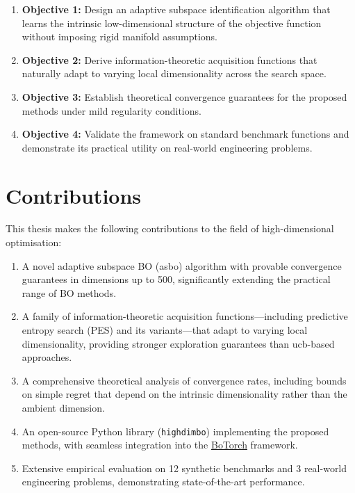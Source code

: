 \begin{enumerate}
    \item \textbf{Objective 1:} Design an adaptive subspace identification
    algorithm that learns the intrinsic low-dimensional structure of the
    objective function without imposing rigid manifold assumptions.

    \item \textbf{Objective 2:} Derive information-theoretic acquisition
    functions that naturally adapt to varying local dimensionality across the
    search space.

    \item \textbf{Objective 3:} Establish theoretical convergence guarantees
    for the proposed methods under mild regularity conditions.

    \item \textbf{Objective 4:} Validate the framework on standard benchmark
    functions and demonstrate its practical utility on real-world engineering
    problems.
\end{enumerate}

\section{Contributions}
\label{sec:contributions}

This thesis makes the following contributions to the field of high-dimensional
optimisation:

\begin{enumerate}
    \item A novel adaptive subspace BO (\gls{asbo}) algorithm with provable
    convergence guarantees in dimensions up to 500, significantly extending the
    practical range of BO methods.

    \item A family of information-theoretic acquisition functions---including
    predictive entropy search (PES) and its variants---that adapt to varying
    local dimensionality, providing stronger exploration guarantees than
    \gls{ucb}-based approaches.

    \item A comprehensive theoretical analysis of convergence rates, including
    bounds on simple regret that depend on the intrinsic dimensionality rather
    than the ambient dimension.

    \item An open-source Python library (\texttt{highdimbo}) implementing the
    proposed methods, with seamless integration into the
    \href{https://github.com/pytorch/botorch}{BoTorch} framework.

    \item Extensive empirical evaluation on 12 synthetic benchmarks and 3
    real-world engineering problems, demonstrating state-of-the-art performance.
\end{enumerate}

